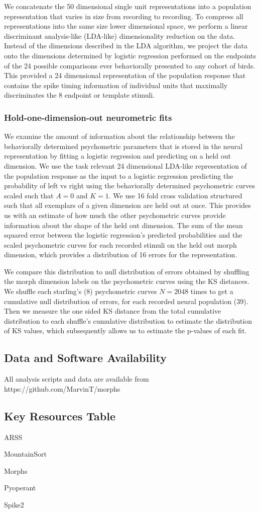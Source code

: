 We concatenate the 50 dimensional single unit representations into a population representation that varies in size from recording to recording. To compress all representations into the same size lower dimensional space, we perform a linear discriminant analysis-like (LDA-like) dimensionality reduction on the data. Instead of the dimensions described in the LDA algorithm, we project the data onto the dimensions determined by logistic regression performed on the endpoints of the 24 possible comparisons ever behaviorally presented to any cohort of birds. This provided a 24 dimensional representation of the population response that contains the spike timing information of individual units that maximally discriminates the 8 endpoint or template stimuli.

\subsubsection{Hold-one-dimension-out neurometric fits}

We examine the amount of information about the relationship between the behaviorally determined psychometric parameters that is stored in the neural representation by fitting a logistic regression and predicting on a held out dimension. We use the task relevant 24 dimensional LDA-like representation of the population response as the input to a logistic regression predicting the probability of left vs right using the behaviorally determined psychometric curves scaled such that $A=0$ and $K=1$. We use 16 fold cross validation structured such that all exemplars of a given dimension are held out at once. This provides us with an estimate of how much the other psychometric curves provide information about the shape of the held out dimension. The sum of the mean squared error between the logistic regression's predicted probabilities and the scaled psychometric curves for each recorded stimuli on the held out morph dimension, which provides a distribution of 16 errors for the representation.

We compare this distribution to null distribution of errors obtained by shuffling the morph dimension labels on the psychometric curves using the \ac{KS} distances. We shuffle each starling's (8) psychometric curves $N=2048$ times to get a cumulative null distribution of errors, for each recorded neural population (39). Then we measure the one sided KS distance from the total cumulative distribution to each shuffle's cumulative distribution to estimate the distribution of KS values, which subsequently allows us to estimate the p-values of each fit.

\subsection{Data and Software Availability}
All analysis scripts and data are available from https://github.com/MarvinT/morphs

\subsection{Key Resources Table}
ARSS

MountainSort

Morphs

Pyoperant

Spike2